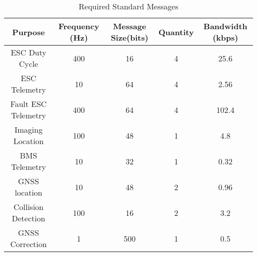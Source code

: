 \begin{table}[h]
\centering
\begin{tabular}{|c|c|c|c|c|} 
\hline
\textbf{Purpose}&\textbf{Frequency (Hz)}&\textbf{Message Size(bits)}&\textbf{Quantity}&\textbf{Bandwidth (kbps)}\\
\hline
ESC Duty Cycle&400&16&4&25.6\\
ESC Telemetry&10&64&4&2.56\\
Fault ESC Telemetry&400&64&4&102.4\\
Imaging Location&100&48&1&4.8\\
BMS Telemetry&10&32&1&0.32\\
GNSS location&10&48&2&0.96\\
Collision Detection&100&16&2&3.2\\
GNSS Correction&1&500&1&0.5\\
\hline
\end{tabular}
\caption{Required Standard Messages}
\label{tab:device_comms_requirementsl}
\end{table}

